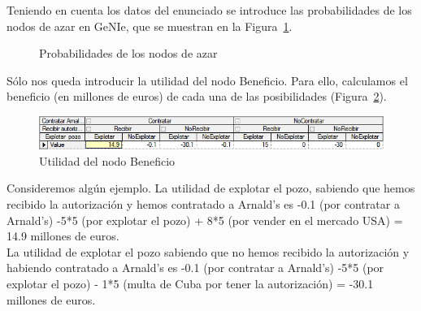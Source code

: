 \documentclass[12pt,a4paper,openright,final]{article}
\begin{document}
Teniendo en cuenta los datos del enunciado se introduce las probabilidades de los nodos de azar en GeNIe, que se muestran en la Figura~\ref{fig:azar}.

\begin{figure}[htbp!]
	\centering
	\hspace{10mm}
	\vspace{10mm}
	\caption{Probabilidades de los nodos de azar} \label{fig:azar}
\end{figure}

Sólo nos queda introducir la utilidad del nodo Beneficio. Para ello, calculamos el beneficio (en millones de euros) de cada una de las posibilidades (Figura~\ref{fig:utilidad}).\\

\begin{figure}[tbph!]
	\centering
	\includegraphics[width=\linewidth]{imagenes/utilidad.png}
	\caption{Utilidad del nodo Beneficio}
	\label{fig:utilidad}
\end{figure}

Consideremos algún ejemplo. La utilidad de explotar el pozo, sabiendo que hemos recibido la autorización y hemos contratado a Arnald's es -0.1 (por contratar a Arnald's) -5*5 (por explotar el pozo) + 8*5 (por vender en el mercado USA) = 14.9 millones de euros.\\

La utilidad de explotar el pozo sabiendo que no hemos recibido la autorización y habiendo contratado a Arnald's es -0.1 (por contratar a Arnald's) -5*5 (por explotar el pozo) - 1*5 (multa de Cuba por tener la autorización) = -30.1 millones de euros.\\
\end{document}
